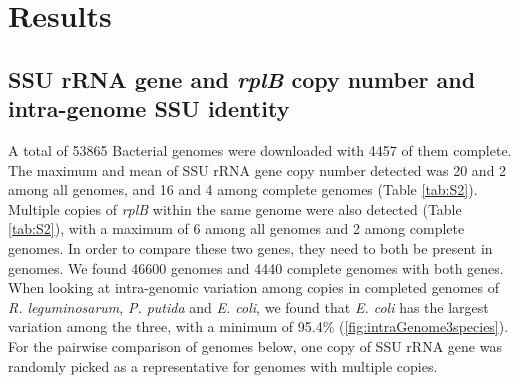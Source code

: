 \documentclass[]{msu-thesis}
\begin{document}
\section{Results}

\subsection{SSU rRNA gene and \textit{rplB} copy number and intra-genome SSU identity}
A total of 53865 Bacterial genomes were downloaded with 4457 of them complete. The maximum and mean of SSU rRNA gene copy number detected was 20 and 2 among all genomes, and 16 and 4 among complete genomes (Table \ref{tab:S2}). Multiple copies of \textit{rplB} within the same genome were also detected (Table \ref{tab:S2}), with a maximum of 6 among all genomes and 2 among complete genomes. In order to compare these two genes, they need to both be present in genomes. We found 46600 genomes and 4440 complete genomes with both genes. When looking at intra-genomic variation among copies in completed genomes of \textit{R. leguminosarum}, \textit{P. putida} and \textit{E. coli}, we found that \textit{E. coli} has the largest variation among the three, with a minimum of 95.4\% (\cref{fig:intraGenome3species}). For the pairwise comparison of genomes below, one copy of SSU rRNA gene was randomly picked as a representative for genomes with multiple copies.
\end{document}
